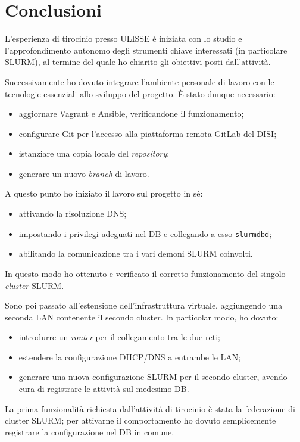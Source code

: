 \documentclass[12pt,a4paper,twoside,openright]{book}
\begin{document}
\chapter{\textbf{Conclusioni}} %
L'esperienza di tirocinio presso \acf{ULISSE} è iniziata con lo studio e l'approfondimento autonomo degli strumenti chiave interessati (in particolare \acf{SLURM}), al termine del quale ho chiarito gli obiettivi posti dall'attività.

Successivamente ho dovuto integrare l'ambiente personale di lavoro con le tecnologie essenziali allo sviluppo del progetto. È stato dunque necessario:
\begin{itemize}
    \item aggiornare Vagrant e Ansible, verificandone il funzionamento;
    \item configurare Git per l'accesso alla piattaforma remota GitLab del \ac{DISI};
    \item istanziare una copia locale del \textit{repository};
    \item generare un nuovo \textit{branch} di lavoro.
\end{itemize}
A questo punto ho iniziato il lavoro sul progetto in sé:
\begin{itemize}
    \item attivando la risoluzione \ac{DNS};
    \item impostando i privilegi adeguati nel \ac{DB} e collegando a esso \texttt{slurmdbd};
    \item abilitando la comunicazione tra i vari demoni \ac{SLURM} coinvolti.
\end{itemize}
In questo modo ho ottenuto e verificato il corretto funzionamento del singolo \textit{cluster} \ac{SLURM}.

Sono poi passato all'estensione dell'infrastruttura virtuale, aggiungendo una seconda \ac{LAN} contenente il secondo cluster. In particolar modo, ho dovuto:
\begin{itemize}
    \item introdurre un \textit{router} per il collegamento tra le due reti;
    \item estendere la configurazione \ac{DHCP}/\ac{DNS} a entrambe le \ac{LAN};
    \item generare una nuova configurazione \ac{SLURM} per il secondo cluster, avendo cura di registrare le attività sul medesimo \ac{DB}.
\end{itemize}
La prima funzionalità richiesta dall'attività di tirocinio è stata la federazione di cluster \ac{SLURM}; per attivarne il comportamento ho dovuto semplicemente registrare la configurazione nel \ac{DB} in comune.
\end{document}
